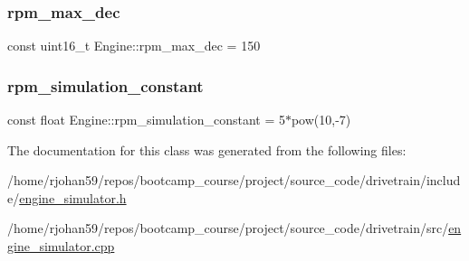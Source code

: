 \subsubsection{\texorpdfstring{rpm\+\_\+max\+\_\+dec}{rpm\_max\_dec}}
{\footnotesize\ttfamily const uint16\+\_\+t Engine\+::rpm\+\_\+max\+\_\+dec = 150\hspace{0.3cm}{\ttfamily [private]}}

\mbox{\label{classEngine_aac9426589cebccaa8cadf7cc7a0ba9be}} 
\subsubsection{\texorpdfstring{rpm\+\_\+simulation\+\_\+constant}{rpm\_simulation\_constant}}
{\footnotesize\ttfamily const float Engine\+::rpm\+\_\+simulation\+\_\+constant = 5$\ast$pow(10,-\/7)\hspace{0.3cm}{\ttfamily [private]}}



The documentation for this class was generated from the following files\+:\begin{DoxyCompactItemize}
\item 
/home/rjohan59/repos/bootcamp\+\_\+course/project/source\+\_\+code/drivetrain/include/\hyperlink{engine__simulator_8h}{engine\+\_\+simulator.\+h}\item 
/home/rjohan59/repos/bootcamp\+\_\+course/project/source\+\_\+code/drivetrain/src/\hyperlink{engine__simulator_8cpp}{engine\+\_\+simulator.\+cpp}\end{DoxyCompactItemize}
